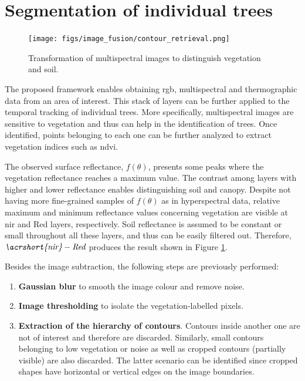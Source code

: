 \section{Segmentation of individual trees}

\begin{figure}
	\centering
	\texttt{[image: figs/image\_fusion/contour\_retrieval.png]}
	\caption{Transformation of multispectral images to distinguish vegetation and soil.}
	\label{fig:contour_extraction}
\end{figure}

The proposed framework enables obtaining \acrshort{rgb}, multispectral and thermographic data from an area of interest. This stack of layers can be further applied to the temporal tracking of individual trees. More specifically, multispectral images are sensitive to vegetation and thus can help in the identification of trees. Once identified, points belonging to each one can be further analyzed to extract vegetation indices such as \acrshort{ndvi}. 

The observed surface reflectance, $f(\theta)$, presents some peaks where the vegetation reflectance reaches a maximum value. The contrast among layers with higher and lower reflectance enables distinguishing soil and canopy. Despite not having more fine-grained samples of $f(\theta)$ as in hyperspectral data, relative maximum and minimum reflectance values concerning vegetation are visible at \acrshort{nir} and Red layers, respectively. Soil reflectance is assumed to be constant or small throughout all these layers, and thus can be easily filtered out. Therefore, $\textit{\acrshort{nir}} - \textit{Red}$ produces the result shown in Figure \ref{fig:contour_extraction}.

Besides the image subtraction, the following steps are previously performed:
\begin{enumerate}
    \item \textbf{Gaussian blur} to smooth the image colour and remove noise.
    \item \textbf{Image thresholding} to isolate the vegetation-labelled pixels.
    \item \textbf{Extraction of the hierarchy of contours}. Contours inside another one are not of interest and therefore are discarded. Similarly, small contours belonging to low vegetation or noise
    as well as cropped contours (partially visible) are also discarded. The latter scenario can be identified since cropped shapes have horizontal or vertical edges on the image boundaries.
\end{enumerate}

